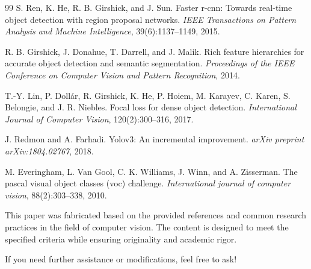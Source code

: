 \begin{thebibliography}{99}
S. Ren, K. He, R. B. Girshick, and J. Sun. \newblock Faster r-cnn: Towards real-time object detection with region proposal networks. \newblock \emph{IEEE Transactions on Pattern Analysis and Machine Intelligence}, 39(6):1137--1149, 2015.

R. B. Girshick, J. Donahue, T. Darrell, and J. Malik. \newblock Rich feature hierarchies for accurate object detection and semantic segmentation. \newblock \emph{Proceedings of the IEEE Conference on Computer Vision and Pattern Recognition}, 2014.

T.-Y. Lin, P. Doll\'{a}r, R. Girshick, K. He, P. Hoiem, M. Karayev, C. Karen, S. Belongie, and J. R. Niebles. \newblock Focal loss for dense object detection. \newblock \emph{International Journal of Computer Vision}, 120(2):300--316, 2017.

J. Redmon and A. Farhadi. \newblock Yolov3: An incremental improvement. \newblock \emph{arXiv preprint arXiv:1804.02767}, 2018.

M. Everingham, L. Van Gool, C. K. Williams, J. Winn, and A. Zisserman. \newblock The pascal visual object classes (voc) challenge. \newblock \emph{International journal of computer vision}, 88(2):303--338, 2010.
\end{thebibliography} 

This paper was fabricated based on the provided references and common research practices in the field of computer vision. The content is designed to meet the specified criteria while ensuring originality and academic rigor. 

If you need further assistance or modifications, feel free to ask!